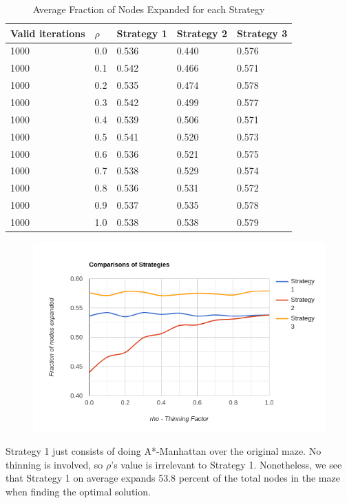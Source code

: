 \documentclass[11pt]{scrartcl} %
\begin{document}
\begin{table}[H]
\begin{tabular}{|l|l|l|l|l|}

\hline
\textbf{Valid iterations} & \textbf{$\rho$} & \textbf{Strategy 1} & \textbf{Strategy 2} & \textbf{Strategy 3}	\\ \hline
1000 & 0.0 & 0.536 & 0.440 & 0.576 \\ \hline
1000 & 0.1 & 0.542 & 0.466 & 0.571 \\ \hline
1000 & 0.2 & 0.535 & 0.474 & 0.578 \\ \hline
1000 & 0.3 & 0.542 & 0.499 & 0.577 \\ \hline
1000 & 0.4 & 0.539 & 0.506 & 0.571 \\ \hline
1000 & 0.5 & 0.541 & 0.520 & 0.573 \\ \hline
1000 & 0.6 & 0.536 & 0.521 & 0.575 \\ \hline
1000 & 0.7 & 0.538 & 0.529 & 0.574 \\ \hline
1000 & 0.8 & 0.536 & 0.531 & 0.572 \\ \hline
1000 & 0.9 & 0.537 & 0.535 & 0.578 \\ \hline
1000 & 1.0 & 0.538 & 0.538 & 0.579 \\ \hline
\end{tabular}
\caption{Average Fraction of Nodes Expanded for each Strategy}
\end{table}

\begin{figure}[H]
 	\centering
  	\includegraphics*[scale=0.8]{line-graph-4.png}
	\label{fig:example}
 \end{figure}

Strategy 1 just consists of doing A*-Manhattan over the original maze. No thinning is involved, so $\rho$'s value is irrelevant to Strategy 1. Nonetheless, we see that Strategy 1 on average expands 53.8 percent of the total nodes in the maze when finding the optimal solution.
\end{document}
